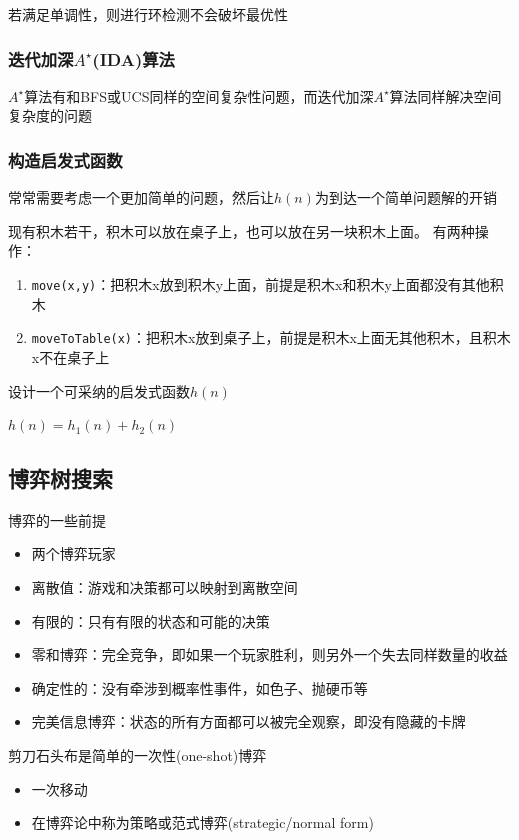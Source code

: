 若满足单调性，则进行环检测不会破坏最优性

\subsubsection{迭代加深$A^\star$(IDA)算法}
$A^\star$算法有和BFS或UCS同样的空间复杂性问题，而迭代加深$A^\star$算法同样解决空间复杂度的问题

\subsubsection{构造启发式函数}
常常需要考虑一个更加简单的问题，然后让$h(n)$为到达一个简单问题解的开销

\begin{example}
现有积木若干，积木可以放在桌子上，也可以放在另一块积木上面。
有两种操作：
\begin{enumerate}
	\item \verb'move(x,y)'：把积木x放到积木y上面，前提是积木x和积木y上面都没有其他积木
	\item \verb'moveToTable(x)'：把积木x放到桌子上，前提是积木x上面无其他积木，且积木x不在桌子上
\end{enumerate}
设计一个可采纳的启发式函数$h(n)$
\end{example}
\begin{analysis}
$h(n)=h_1(n)+h_2(n)$
\end{analysis}

\subsection{博弈树搜索}
博弈的一些前提
\begin{itemize}
	\item 两个博弈玩家
	\item 离散值：游戏和决策都可以映射到离散空间
	\item 有限的：只有有限的状态和可能的决策
	\item 零和博弈：完全竞争，即如果一个玩家胜利，则另外一个失去同样数量的收益
	\item 确定性的：没有牵涉到概率性事件，如色子、抛硬币等
	\item 完美信息博弈：状态的所有方面都可以被完全观察，即没有隐藏的卡牌
\end{itemize}

剪刀石头布是简单的一次性(one-shot)博弈
\begin{itemize}
	\item 一次移动
	\item 在博弈论中称为策略或范式博弈(strategic/normal form)
\end{itemize}

